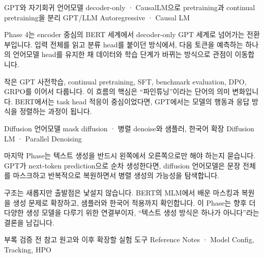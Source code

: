 \documentclass[11pt]{book}
\providecommand{\chapterdir}{chapters}
\newcommand{\inputchapter}[1]{}
\begin{document}
  {GPT와 자기회귀 언어모델}
  {decoder-only · CausalLM으로 pretraining과 continual pretraining을 분리}
  {GPT/LLM Autoregressive · Causal LM}
  {
    Phase 4는 encoder 중심의 BERT 세계에서 decoder-only GPT 세계로 넘어가는 전환부입니다. 입력 전체를 읽고 분류 head를 붙이던 방식에서, 다음 토큰을 예측하는 하나의 언어모델 head를 유지한 채 데이터와 학습 단계가 바뀌는 방식으로 관점이 이동합니다.

    작은 GPT 사전학습, continual pretraining, SFT, benchmark evaluation, DPO, GRPO를 이어서 다룹니다. 이 흐름의 핵심은 “파인튜닝”이라는 단어의 의미 변화입니다. BERT에서는 task head 적응이 중심이었다면, GPT에서는 모델의 행동과 응답 방식을 정렬하는 과정이 됩니다.
  }
  {
  }
\inputchapter{ch24_gpt_tinystories}
\inputchapter{ch25_gpt2_continual_pretrain}
\inputchapter{ch26_ko_tiny_gpt}
\inputchapter{ch27_ko_gpt2_continual_pretrain}
\inputchapter{ch28_sft}
\inputchapter{ch29_benchmark_eval}
\inputchapter{ch30_dpo}
\inputchapter{ch31_grpo}

  {Diffusion 언어모델}
  {mask diffusion · 병렬 denoise와 샘플러, 한국어 확장}
  {Diffusion LM · Parallel Denoising}
  {
    마지막 Phase는 텍스트 생성을 반드시 왼쪽에서 오른쪽으로만 해야 하는지 묻습니다. GPT가 next-token prediction으로 순차 생성한다면, diffusion 언어모델은 문장 전체를 마스크하고 반복적으로 복원하면서 병렬 생성의 가능성을 탐색합니다.

    구조는 새롭지만 출발점은 낯설지 않습니다. BERT의 MLM에서 배운 마스킹과 복원을 생성 문제로 확장하고, 샘플러와 한국어 적용까지 확인합니다. 이 Phase는 향후 더 다양한 생성 모델을 다루기 위한 연결부이자, “텍스트 생성 방식은 하나가 아니다”라는 결론을 남깁니다.
  }
  {
  }
\inputchapter{ch32_diffusion_intro}
\inputchapter{ch33_diffusion_train}
\inputchapter{ch34_ko_diffusion}

\appendix
\appendixpart
  {부록}
  {검증 전 참고 원고와 이후 확장할 실험 도구}
  {Reference Notes · Model Config, Tracking, HPO}
  {
  }




\backmatter

\cleardoublepage
{}
\printindex
\end{document}
